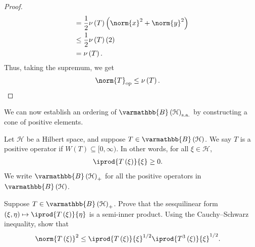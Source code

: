 \documentclass[10pt]{mypackage}
\renewcommand*{\mathbb}[1]{\varmathbb{#1}}
\newcommand{\sa}{\text{s.a.}}
\newcommand{\B}{\mathbb{B}}
\begin{document}
\begin{proof}
\begin{align*}
                                                      &= \frac{1}{2}\nu\left(T\right)\left(\norm{x}^2 + \norm{y}^2\right)\\
                                                      &\leq \frac{1}{2}\nu\left(T\right)\left(2\right)\\
                                                      &= \nu\left(T\right).
  \end{align*}
  Thus, taking the supremum, we get
  \begin{align*}
    \norm{T}_{\text{op}} &\leq \nu\left(T\right).
  \end{align*}
\end{proof}
We can now establish an ordering of $\B\left(\mathcal{H}\right)_{\sa}$ by constructing a cone of positive elements.
\begin{definition}
  Let $\mathcal{H}$ be a Hilbert space, and suppose $T\in \B\left(\mathcal{H}\right)$. We say $T$ is a positive operator if $W(T) \subseteq [0,\infty)$. In other words, for all $\xi\in \mathcal{H}$,
  \begin{align*}
    \iprod{T\left(\xi\right)}{\xi} &\geq 0.
  \end{align*}
  We write $\B\left(\mathcal{H}\right)_{+}$ for all the positive operators in $\B\left(\mathcal{H}\right)$.
\end{definition}
\begin{exercise}
  Suppose $T\in \B\left(\mathcal{H}\right)_{+}$. Prove that the sesquilinear form $\left(\xi,\eta\right)\mapsto \iprod{T\left(\xi\right)}{\eta}$ is a semi-inner product. Using the Cauchy--Schwarz inequality, show that
  \begin{align*}
    \norm{T\left(\xi\right)}^2 &\leq \iprod{T\left(\xi\right)}{\xi}^{1/2} \iprod{T^3\left(\xi\right)}{\xi}^{1/2}.
  \end{align*}
\end{exercise}
\end{document}

